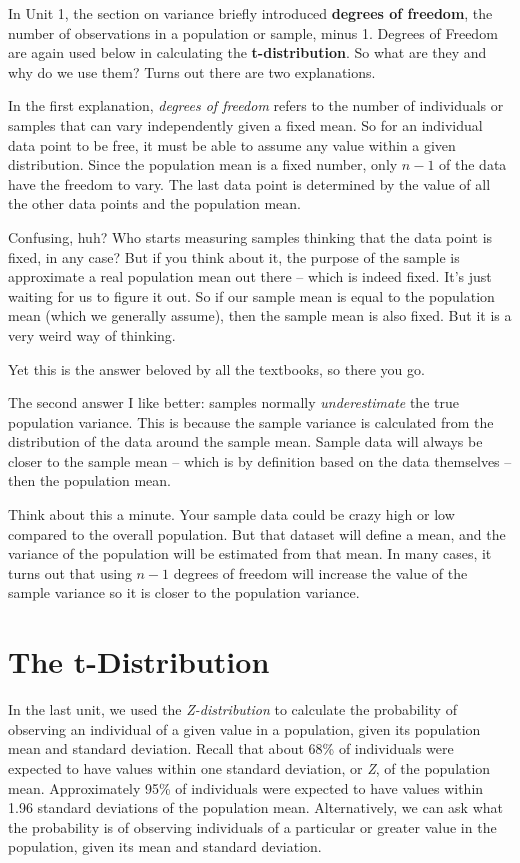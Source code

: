 \documentclass[
]{book}
\begin{document}
In Unit 1, the section on variance briefly introduced \textbf{degrees of
freedom}, the number of observations in a population or sample, minus
1. Degrees of Freedom are again used below in calculating the
\textbf{t-distribution}. So what are they and why do we use them? Turns out
there are two explanations.

In the first explanation, \emph{degrees of freedom} refers to the number of
individuals or samples that can vary independently given a fixed mean.
So for an individual data point to be free, it must be able to assume
any value within a given distribution. Since the population mean is a
fixed number, only \(n-1\) of the data have the freedom to vary. The last
data point is determined by the value of all the other data points and
the population mean.

Confusing, huh? Who starts measuring samples thinking that the data
point is fixed, in any case? But if you think about it, the purpose of
the sample is approximate a real population mean out there -- which is
indeed fixed. It's just waiting for us to figure it out. So if our
sample mean is equal to the population mean (which we generally assume),
then the sample mean is also fixed. But it is a very weird way of
thinking.

Yet this is the answer beloved by all the textbooks, so there you go.

The second answer I like better: samples normally \emph{underestimate} the
true population variance. This is because the sample variance is
calculated from the distribution of the data around the sample mean.
Sample data will always be closer to the sample mean -- which is by
definition based on the data themselves -- then the population mean.

Think about this a minute. Your sample data could be crazy high or low
compared to the overall population. But that dataset will define a mean,
and the variance of the population will be estimated from that mean. In
many cases, it turns out that using \(n-1\) degrees of freedom will
increase the value of the sample variance so it is closer to the
population variance.

\hypertarget{the-t-distribution}{%
\section{The t-Distribution}\label{the-t-distribution}}

In the last unit, we used the \emph{Z-distribution} to calculate the
probability of observing an individual of a given value in a population,
given its population mean and standard deviation. Recall that about 68\%
of individuals were expected to have values within one standard
deviation, or \emph{Z}, of the population mean. Approximately 95\% of
individuals were expected to have values within 1.96 standard deviations
of the population mean. Alternatively, we can ask what the probability
is of observing individuals of a particular or greater value in the
population, given its mean and standard deviation.
\end{document}
